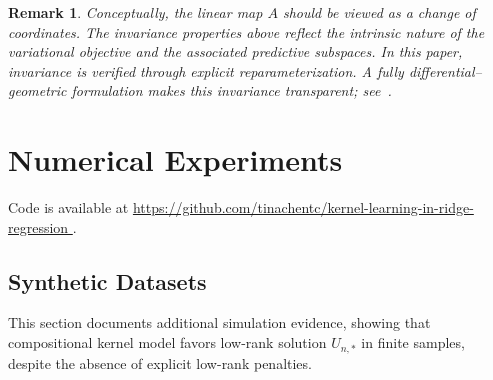 \documentclass[sn-mathphys-num]{sn-jnl}%
\numberwithin{equation}{section}
\theoremstyle{thmstyleone}%
\theoremstyle{thmstyletwo}%
\newtheorem{remark}{Remark}%
\theoremstyle{thmstylethree}%
\begin{document}
\vspace{.5em} 

\begin{remark}
\emph{
Conceptually, the linear map $A$ should be viewed as a change of
coordinates. The invariance properties above reflect the intrinsic nature of the variational
objective and the associated predictive subspaces. 
In this paper, invariance is
verified through explicit reparameterization. A fully differential–geometric 
formulation makes this invariance transparent; see~\cite{LiRu25}.
}
\end{remark} 

\vspace{-.25em} 

\newcommand{\subjectto}{{\rm subject~to}}
\section{Numerical Experiments} 
\label{sec:numerical-experiments}
Code is available at
\url{
https://github.com/tinachentc/kernel-learning-in-ridge-regression
}.


\subsection{Synthetic Datasets} 
\indent\indent
This section documents additional simulation evidence, showing that compositional kernel 
model favors low-rank solution $U_{n, *}$ in finite samples, despite the absence of explicit 
low-rank penalties. 

\end{document}
